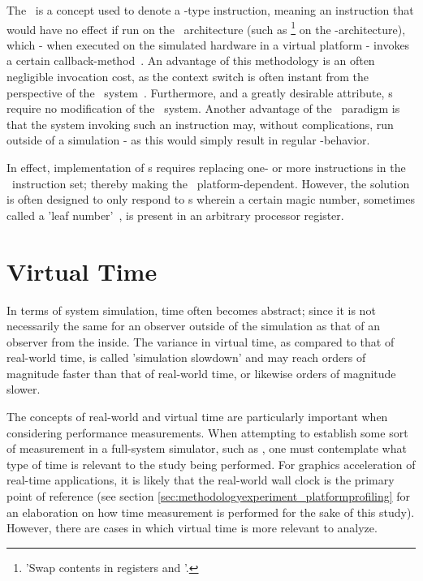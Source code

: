 The \dvttermmagicinstruction\ is a concept used to denote a -type instruction, meaning an instruction that would have no effect if run on the \dvttermtarget\ architecture (such as \footnote{'Swap contents in registers  and '.} on the \dvttermxeightysix -architecture), which - when executed on the simulated hardware in a virtual platform - invokes a certain callback-method~.
An advantage of this methodology is an often negligible invocation cost, as the context switch is often instant from the perspective of the \dvttermtarget\ system~.
Furthermore, and a greatly desirable attribute, \dvttermmagicinstruction s require no modification of the \dvttermtarget\ system.
Another advantage of the \dvttermmagicinstruction\ paradigm is that the system invoking such an instruction may, without complications, run outside of a simulation - as this would simply result in regular -behavior.

In effect, implementation of \dvttermmagicinstruction s requires replacing one- or more instructions in the \dvttermtarget\ instruction set; thereby making the \dvttermmagicinstruction\ platform-dependent.
However, the solution is often designed to only respond to \dvttermmagicinstruction s wherein a certain magic number, sometimes called a 'leaf number'~, is present in an arbitrary processor register.

\section{Virtual Time}
\label{sec:backgroundandrelatedwork_virtualtime}
In terms of system simulation, time often becomes abstract; since it is not necessarily the same for an observer outside of the simulation as that of an observer from the inside.
The variance in virtual time, as compared to that of real-world time, is called 'simulation slowdown' and may reach orders of magnitude faster than that of real-world time, or likewise orders of magnitude slower.

The concepts of real-world and virtual time are particularly important when considering performance measurements.
When attempting to establish some sort of measurement in a full-system simulator, such as \dvttermsimics , one must contemplate what type of time is relevant to the study being performed.
For graphics acceleration of real-time applications, it is likely that the real-world wall clock is the primary point of reference (see section \ref{sec:methodologyexperiment_platformprofiling} for an elaboration on how time measurement is performed for the sake of this study).
However, there are cases in which virtual time is more relevant to analyze.

